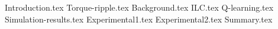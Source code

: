 \documentclass[english, 12pt, a4paper, elec, utf8, a-2b, online]{aaltothesis}
\begin{document}
\cleardoublepage

{Introduction.tex}
{Torque-ripple.tex}
{Background.tex}
{ILC.tex}
{Q-learning.tex}
{Simulation-results.tex}
{Experimental1.tex}
{Experimental2.tex}
{Summary.tex}

\thesisbibliography

\end{document}
